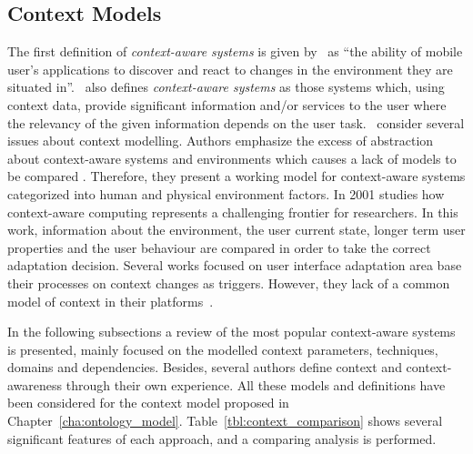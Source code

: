 \subsection{Context Models}
\label{sec:context_models}

The first definition of \textit{context-aware systems} is given by~\citet{schilit_disseminating_1994}
as ``the ability of mobile user's applications to discover and react to changes 
in the environment they are situated in''.~\citet{dey_understanding_2001} also 
defines \textit{context-aware systems} as those systems which, using context data, 
provide significant information and/or services to the user where the relevancy 
of the given information depends on the user task.~\citet{schmidt_there_1999} 
consider several issues about context modelling. Authors emphasize the excess of 
abstraction about context-aware systems and environments which causes a lack of 
models to be compared . Therefore, they present a working model for context-aware 
systems categorized into human and physical environment factors. In 2001
\citet{jameson_modelling_2001} studies how context-aware computing represents a 
challenging frontier for researchers. In this work, information about the 
environment, the user current state, longer term user properties and the user 
behaviour are compared in order to take the correct adaptation decision. Several 
works focused on user interface adaptation area base their processes on context 
changes as triggers. However, they lack of a common model of context in their 
platforms~\citep{calvary_plasticity_2002}\citep{nilsson_model_based_2006}.

In the following subsections a review of the most popular context-aware systems
is presented, mainly focused on the modelled context parameters, techniques, 
domains and dependencies. Besides, several authors define context and 
context-awareness through their own experience. All these models and definitions 
have been considered for the context model proposed in 
Chapter~\ref{cha:ontology_model}. Table~\ref{tbl:context_comparison} shows 
several significant features of each approach, and a comparing analysis is 
performed.















